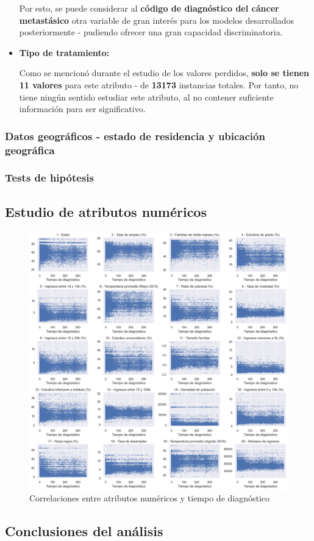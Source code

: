 \begin{itemize}[leftmargin=*]
	Por esto, se puede considerar al \textbf{código de diagnóstico del cáncer metastásico} otra variable de gran interés para los modelos desarrollados posteriormente - pudiendo ofrecer una gran capacidad discriminatoria.
	
	\item \textbf{Tipo de tratamiento:}
	
	Como se mencionó durante el estudio de los valores perdidos, \textbf{solo se tienen 11 valores} para este atributo - de \textbf{13173} instancias totales. Por tanto, no tiene ningún sentido estudiar este atributo, al no contener suficiente información para ser significativo.
\end{itemize}

\subsubsection{Datos geográficos - estado de residencia y ubicación geográfica}

\subsubsection{Tests de hipótesis}

\subsection{Estudio de atributos numéricos}

\begin{figure}[h]
	\centering
	\includegraphics[width=1\linewidth]{figs/chapter3/numerical/correlations.png}
	\captionsetup{belowskip=-15pt, justification=centering}
	\caption{Correlaciones entre atributos numéricos y tiempo de diagnóstico}
	\label{fig:correlations}
\end{figure}


\subsection{Conclusiones del análisis}